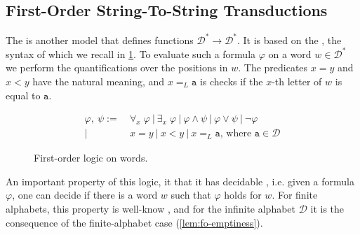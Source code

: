 \subsection{First-Order String-To-String Transductions}
\label{subsec:fo-string-to-string}
\AP The  is another model 
that defines functions $\mathcal{D}^* \to \mathcal{D}^*$. It is based on the ,
the syntax of which we 
recall in \cref{fig:fo-syntax}.
To evaluate such a formula $\varphi$ on a word $w \in \mathcal{D}^*$ we perform the quantifications
over the positions in $w$. The predicates $x = y$ and $x < y$ have the natural 
meaning, and $x =_L \mathtt{a}$ is checks if the $x$-th letter of $w$ is equal to $\mathtt{a}$.
\begin{figure}
    \centering
    \begin{align*}
        \varphi,\ \psi :=&~ \forall_x\; \varphi ~|~ \exists_x\; \varphi ~|~ \varphi \wedge \psi ~|~ \varphi \vee \psi ~|~ \neg \varphi \\
                |&~ x = y ~|~ x < y ~|~ x =_L \mathtt{a} \textrm{, where } \mathtt{a} \in \mathcal{D}
    \end{align*}
    \caption{First-order logic on words.}
    \label{fig:fo-syntax}
\end{figure}

\AP
An important property of this logic, it that it has decidable , i.e. given a formula
$\varphi$, one can decide if there is a word $w$ such that $\varphi$ holds for $w$. For finite alphabets,
this property is well-know \cite{buchi1960weak}, and for the infinite alphabet $\mathcal{D}$ it is 
the consequence of the finite-alphabet case (\cref{lem:fo-emptiness}).

